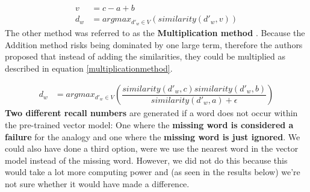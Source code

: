 \begin{equation}
\begin{split}
\label{multiplicationmethod}
v &= c-a+b\\
d_w &= argmax_{d'_w \in V}(similarity(d'_w, v) )
\end{split}
\end{equation}
\newline
The other method was referred to as the \textbf{Multiplication method} \cite{leviandgoldberg}. Because the Addition method risks being dominated by one large term, therefore the authors proposed that instead of adding the similarities, they could be multiplied as described in equation \ref{multiplicationmethod}.

\begin{equation}
\begin{split}
\label{multiplicationmethod}
d_w &= argmax_{d'_w \in V}(\dfrac{similarity(d'_w, c) similarity(d'_w, b)}{similarity(d'_w, a) + \epsilon} )
\end{split}
\end{equation}
\newline
\textbf{Two different recall numbers} are generated if a word does not occur within the pre-trained vector model: One where the \textbf{missing word is considered a failure} for the analogy and one where the \textbf{missing word is just ignored}. We could also have done a third option, were we use the nearest word in the vector model instead of the missing word. However, we did not do this because this would take a lot more computing power and (as seen in the results below) we're not sure whether it would have made a difference.